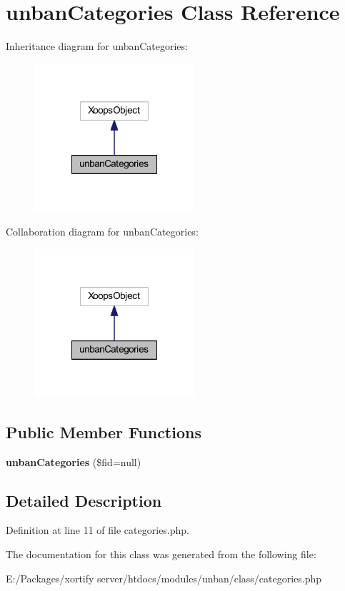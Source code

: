 \hypertarget{classunban_categories}{\section{unban\-Categories Class Reference}
\label{classunban_categories}
}


Inheritance diagram for unban\-Categories\-:
\nopagebreak
\begin{figure}[H]
\begin{center}
\leavevmode
\includegraphics[width=168pt]{classunban_categories__inherit__graph}
\end{center}
\end{figure}


Collaboration diagram for unban\-Categories\-:
\nopagebreak
\begin{figure}[H]
\begin{center}
\leavevmode
\includegraphics[width=168pt]{classunban_categories__coll__graph}
\end{center}
\end{figure}
\subsection*{Public Member Functions}
\begin{DoxyCompactItemize}
\item 
\hypertarget{classunban_categories_a23a3187b5fd559e631894ceedb521d06}{{\bfseries unban\-Categories} (\$fid=null)}\label{classunban_categories_a23a3187b5fd559e631894ceedb521d06}

\end{DoxyCompactItemize}


\subsection{Detailed Description}


Definition at line 11 of file categories.\-php.



The documentation for this class was generated from the following file\-:\begin{DoxyCompactItemize}
\item 
E\-:/\-Packages/xortify server/htdocs/modules/unban/class/categories.\-php\end{DoxyCompactItemize}
